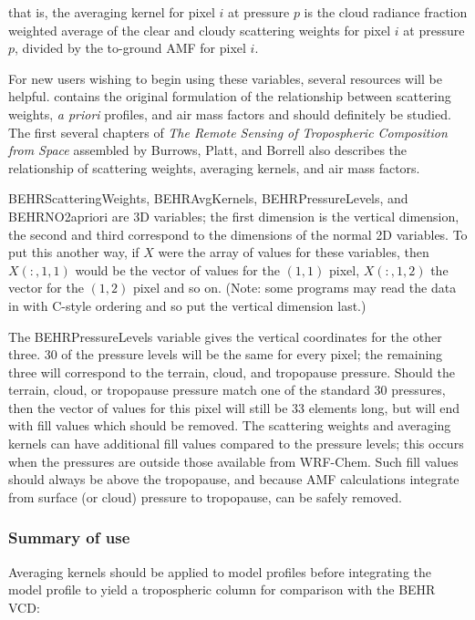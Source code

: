 \documentclass[12pt]{article}
\begin{document}
that is, the averaging kernel for pixel $i$ at pressure $p$ is the cloud radiance fraction weighted average of the clear and cloudy scattering weights for pixel $i$ at pressure $p$, divided by the to-ground AMF for pixel $i$.
	
	For new users wishing to begin using these variables, several resources will be helpful. \citet{palmer2001} contains the original formulation of the relationship between scattering weights, \emph{a priori}  profiles, and air mass factors and should definitely be studied. The first several chapters of \emph{The Remote Sensing of Tropospheric Composition from Space} assembled by Burrows, Platt, and Borrell \citep{burrows-platt} also describes the relationship of scattering weights, averaging kernels, and air mass factors.
	
    BEHRScatteringWeights, BEHRAvgKernels, BEHRPressureLevels, and BEHRNO2apriori are 3D variables; the first dimension is the vertical dimension, the second and third correspond to the dimensions of the normal 2D variables. To put this another way, if $X$ were the array of values for these variables, then $X(:,1,1)$ would be the vector of values for the $(1,1)$ pixel, $X(:,1,2)$ the vector for the $(1,2)$ pixel and so on. (Note: some programs may read the data in with C-style ordering and so put the vertical dimension last.)
	
	The BEHRPressureLevels variable gives the vertical coordinates for the other three.  30 of the pressure levels will be the same for every pixel; the remaining three will correspond to the terrain, cloud, and tropopause pressure. Should the terrain, cloud, or tropopause pressure match one of the standard 30 pressures, then the vector of values for this pixel will still be 33 elements long, but will end with fill values which should be removed.  The scattering weights and averaging kernels can have additional fill values compared to the pressure levels; this occurs when the pressures are outside those available from WRF-Chem. Such fill values should always be above the tropopause, and because AMF calculations integrate from surface (or cloud) pressure to tropopause, can be safely removed.
	
	\subsubsection{Summary of use}
	
	Averaging kernels should be applied to model profiles before integrating the model profile to yield a tropospheric column for comparison with the BEHR VCD:
	
\end{document}
